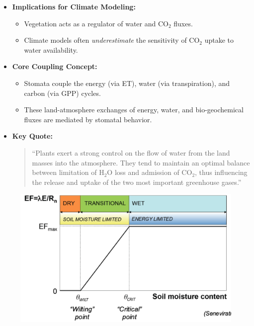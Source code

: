 \documentclass[fontsize=8pt, a4paper, landscape, fleqn]{scrartcl}
\begin{document}
\begin{multicols*}{3}[\raggedcolumns]
\begin{itemize}
    \item \textbf{Implications for Climate Modeling:}
    \begin{itemize}
        \item Vegetation acts as a regulator of water and CO$_2$ fluxes.
        \item Climate models often \textit{underestimate} the sensitivity of CO$_2$ uptake to water availability.
    \end{itemize}

    \item \textbf{Core Coupling Concept:}
    \begin{itemize}
        \item Stomata couple the energy (via ET), water (via transpiration), and carbon (via GPP) cycles.
        \item These land-atmosphere exchanges of energy, water, and bio-geochemical fluxes are mediated by stomatal behavior.
    \end{itemize}

    \item \textbf{Key Quote:}
    \begin{quote}
    “Plants exert a strong control on the flow of water from the land masses into the atmosphere. They tend to maintain an optimal balance between limitation of H$_2$O loss and admission of CO$_2$, thus influencing the release and uptake of the two most important greenhouse gases.”
    \end{quote}
\end{itemize}
\begin{figure}[H]
    \centering
    \includegraphics[width=1\linewidth]{CS//img/Schematic representation of soil moisture effects.png}
\end{figure}


\end{multicols*}
\end{document}
